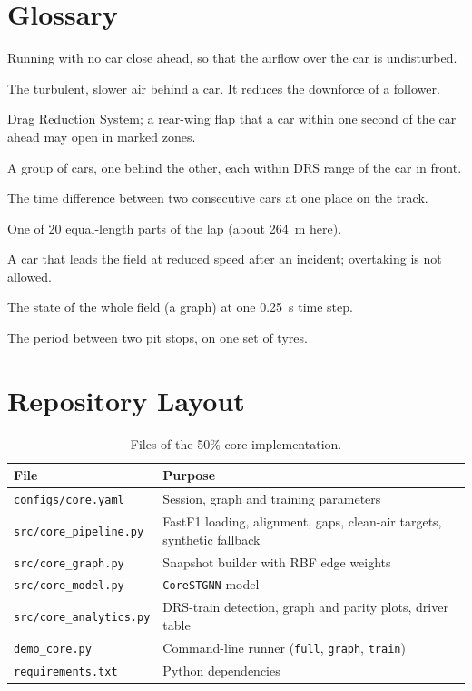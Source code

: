 \documentclass[11pt,a4paper]{article}
\begin{document}
\appendix
\section{Glossary}
\begin{description}[leftmargin=2.6cm,style=nextline]
  \item[Clean air] Running with no car close ahead, so that the airflow over the car is undisturbed.
  \item[Dirty air] The turbulent, slower air behind a car. It reduces the downforce of a follower.
  \item[DRS] Drag Reduction System; a rear-wing flap that a car within one second of the car ahead may open in marked zones.
  \item[DRS train] A group of cars, one behind the other, each within DRS range of the car in front.
  \item[Gap] The time difference between two consecutive cars at one place on the track.
  \item[Mini-sector] One of 20 equal-length parts of the lap (about 264~m here).
  \item[Safety Car] A car that leads the field at reduced speed after an incident; overtaking is not allowed.
  \item[Snapshot] The state of the whole field (a graph) at one 0.25~s time step.
  \item[Stint] The period between two pit stops, on one set of tyres.
\end{description}

\section{Repository Layout}
\begin{table}[H]
\centering
\caption{Files of the 50\% core implementation.}
\small
\begin{tabularx}{\linewidth}{@{}lX@{}}
\toprule
\textbf{File} & \textbf{Purpose} \\
\midrule
\texttt{configs/core.yaml} & Session, graph and training parameters \\
\texttt{src/core\_pipeline.py} & FastF1 loading, alignment, gaps, clean-air targets, synthetic fallback \\
\texttt{src/core\_graph.py} & Snapshot builder with RBF edge weights \\
\texttt{src/core\_model.py} & \texttt{CoreSTGNN} model \\
\texttt{src/core\_analytics.py} & DRS-train detection, graph and parity plots, driver table \\
\texttt{demo\_core.py} & Command-line runner (\texttt{full}, \texttt{graph}, \texttt{train}) \\
\texttt{requirements.txt} & Python dependencies \\
\bottomrule
\end{tabularx}
\end{table}
\end{document}
